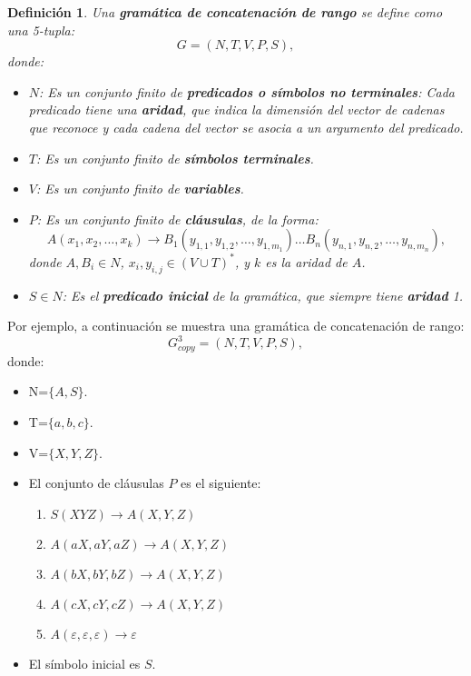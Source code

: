 \documentclass[12pt]{article}
\newtheorem{definition}{Definición}
\begin{document}
\begin{definition}
    Una \textbf{gramática de concatenación de rango} se define como una 5-tupla:
    \[
        G = (N, T, V, P, S),
    \]
    donde:
    
    \begin{itemize}
        \item $N$: Es un conjunto finito de \textbf{predicados o símbolos no terminales}: Cada predicado tiene una \textbf{aridad}, que indica la dimensión del vector de cadenas que reconoce y cada cadena del vector se asocia a un argumento del predicado.
        \item $T$: Es un conjunto finito de \textbf{símbolos terminales}.
        \item $V$: Es un conjunto finito de \textbf{variables}.
        \item $P$: Es un conjunto finito de \textbf{cláusulas}, de la forma:
              \[
                  A(x_1, x_2, \ldots, x_k) \to B_1(y_{1,1}, y_{1,2}, \ldots, y_{1,m_1}) \ldots B_n(y_{n,1}, y_{n,2}, \ldots, y_{n,m_n}),
              \]
              donde $A, B_i \in N$, $x_i, y_{i,j} \in (V \cup T)^*$, y $k$ es la aridad de $A$.
        \item $S \in N$: Es el \textbf{predicado inicial} de la gramática, que siempre tiene \textbf{aridad} 1.
    \end{itemize}
\end{definition}


Por ejemplo, a continuación se muestra una gramática de concatenación de rango:
\label{g_3copy}
\[
    G^3_{copy} = (N, T, V, P, S),
\]
donde:

\begin{itemize}
    \item  N=$\{A,S\}$.
    \item T=$\{a,b,c\}$.
    \item V=$\{X,Y,Z\}$.
    \item El conjunto de cláusulas $P$ es el siguiente:
          \begin{enumerate}
              \item $S(XYZ)\to A(X,Y,Z)$
              \item $A(aX,aY,aZ)\to A(X,Y,Z)$
              \item $A(bX,bY,bZ)\to A(X,Y,Z)$
              \item $A(cX,cY,cZ)\to A(X,Y,Z)$
              \item $A(\varepsilon,\varepsilon,\varepsilon)\to \varepsilon$
          \end{enumerate}
    \item El símbolo inicial es $S$.
\end{itemize}
\end{document}
